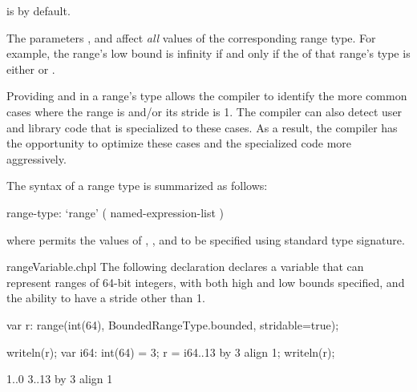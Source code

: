 \noindent {} is  by default.

The parameters ,  and 
affect \emph{all} values of the corresponding range type.
For example, the range's low bound is infinity if and only if
the  of that range's type is either 
or .

\begin{rationale}
Providing  and  in a range's type
allows the compiler to identify the more common cases
where the range is  and/or its stride is 1.
The compiler can also detect user and library code that is
specialized to these cases.
As a result, the compiler has the opportunity to optimize these
cases and the specialized code more aggressively.
\end{rationale}

The syntax of a range type is summarized as follows:
\begin{syntax}
range-type:
  `range' ( named-expression-list )
\end{syntax}
\noindent where  permits the values of
, , and  to be specified
using standard type signature.

\begin{chapelexample}{rangeVariable.chpl}
The following declaration declares a variable 
that can represent ranges of 64-bit integers,
with both high and low bounds specified,
and the ability to have a stride other than 1.
\begin{chapel}
var r: range(int(64), BoundedRangeType.bounded, stridable=true);
\end{chapel}
\begin{chapelpost}
writeln(r);
var i64: int(64) = 3;
r = i64..13 by 3 align 1;
writeln(r);
\end{chapelpost}
\begin{chapeloutput}
1..0
3..13 by 3 align 1
\end{chapeloutput}
\end{chapelexample}


